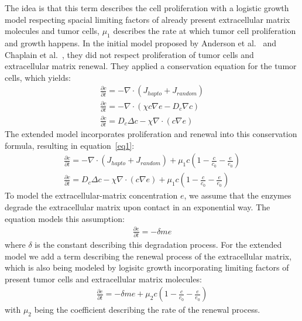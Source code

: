 The idea is that this term describes the cell proliferation with a logistic growth model respecting spacial limiting factors of already present extracellular matrix molecules and tumor cells, $\mu_1$ describes the rate at which tumor cell proliferation and growth happens. In the initial model proposed by Anderson et al.~\cite{anderson_continuous_1998, anderson_mathematical_2000} and Chaplain et al.~\cite{anderson_continuous_1998,chaplain_mathematical_2006-1,franssen_mathematical_2019}, they did not respect proliferation of tumor cells and extracellular matrix renewal. They applied a conservation equation for the tumor cells, which yields:
\begin{align*}
    \frac{\partial c}{\partial t} = -\nabla \cdot (J_{hapto} + J_{random}) \\
    \frac{\partial c}{\partial t} = -\nabla \cdot (\chi c \nabla e -D_c \nabla c ) \\
    \frac{\partial c}{\partial t} = D_c \Delta c - \chi \nabla \cdot (c\nabla e)
\end{align*}
The extended model incorporates proliferation and renewal into this conservation formula, resulting in equation~\ref{eq1}:
\begin{align*}
    \frac{\partial c}{\partial t} = -\nabla \cdot (J_{hapto} + J_{random}) + \mu_1 c (1-\frac{c}{c_0} - \frac{e}{e_0}) \\
    \frac{\partial c}{\partial t} = D_c \Delta c - \chi \nabla \cdot (c\nabla e) + \mu_1 c (1-\frac{c}{c_0} - \frac{e}{e_0})
\end{align*}
To model the extracellular-matrix concentration $e$, we assume that the enzymes degrade the extracellular matrix upon contact in an exponential way. The equation models this assumption:
\begin{align*}
    \frac{\partial e}{\partial t} = -\delta m e
\end{align*}
where $\delta$ is the constant describing this degradation process. For the extended model we add a term describing the renewal process of the extracellular matrix, which is also being modeled by logisitc growth incorporating limiting factors of present tumor cells and extracellular matrix molecules:
\begin{align*}
    \frac{\partial e}{\partial t} = -\delta m e + \mu_2 c (1 - \frac{c}{c_0} - \frac{e}{e_0})
\end{align*}
with $\mu_2$ being the coefficient describing the rate of the renewal process.

